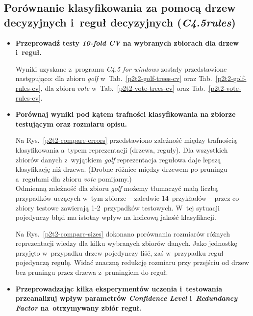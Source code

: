 \subsection{Porównanie klasyfikowania za pomocą drzew decyzyjnych i~reguł decyzyjnych (\emph{C4.5rules})}
\begin{itemize}
\item \textbf{Przeprowadź testy \emph{10-fold CV} na wybranych zbiorach dla drzew i~reguł.}







Wyniki uzyskane z~programu \emph{C4.5 for windows} zostały przedstawione następująco: dla zbioru \emph{golf} w~Tab.~\ref{p2t2-golf-trees-cv} oraz Tab.~\ref{p2t2-golf-rules-cv}, dla zbioru \emph{vote} w~Tab.~\ref{p2t2-vote-trees-cv} oraz Tab.~\ref{p2t2-vote-rules-cv}.

\item \textbf{Porównaj wyniki pod kątem trafności klasyfikowania na zbiorze testującym oraz rozmiaru opisu.}
	
	
Na Rys.~\ref{p2t2-compare-errors} przedstawiono zależność między trafnością klasyfikowania a~typem reprezentacji (drzewa, reguły). Dla wszystkich zbiorów danych z~wyjątkiem \emph{golf} reprezentacja regułowa daje lepszą klasyfikację niż drzewa. (Drobne różnice między drzewem po pruningu a~regułami dla zbioru \emph{vote} pomijamy.)
\\Odmienną zależność dla zbioru \emph{golf} możemy tłumaczyć małą liczbą przypadków uczących w~tym zbiorze -- zaledwie 14~przykładów -- przez co zbiory testowe zawierają 1-2~przypadków testowych. W~tej sytuacji pojedynczy błąd ma istotny wpływ na końcową jakość klasyfikacji.
	
	
Na Rys.~\ref{p2t2-compare-sizes} dokonano porównania rozmiarów różnych reprezentacji wiedzy dla kilku wybranych zbiorów danych. Jako jednostkę przyjęto w~przypadku drzew pojedynczy liść, zaś w~przypadku reguł pojedynczą regułę. Widać znaczną redukcję rozmiaru przy przejściu od drzew bez pruningu przez drzewa z~pruningiem do reguł.
	
\item \textbf{Przeprowadzając kilka eksperymentów uczenia i~testowania przeanalizuj wpływ parametrów \emph{Confidence Level} i~\emph{Redundancy Factor} na~otrzymywany zbiór reguł.}


\end{itemize}
